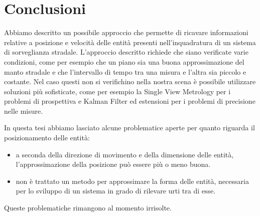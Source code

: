 \chapter{Conclusioni}
\label{sec:conclusioni}

Abbiamo descritto un possibile approccio che permette di ricavare informazioni relative a posizione e velocità delle entità presenti nell'inquadratura di un sistema di sorveglianza stradale.
L'approccio descritto richiede che siano verificate varie condizioni, come per esempio che un piano sia una buona approssimazione del manto stradale e che l'intervallo di tempo tra una misura e l'altra sia piccolo e costante.
Nel caso questi non si verifichino nella nostra scena è possibile utilizzare soluzioni più sofisticate, come per esempio la Single View Metrology \cite{svm} per i problemi di prospettiva e Kalman Filter ed estensioni \cite{kalman} per i problemi di precisione nelle misure.

In questa tesi abbiamo lasciato alcune problematice aperte per quanto riguarda il posizionamento delle entità:
\begin{itemize}
    \item a seconda della direzione di movimento e della dimensione delle entità, l'approssimazione della posizione può essere più o meno buona.
    \item non è trattato un metodo per approssimare la forma delle entità, necessaria per lo sviluppo di un sistema in grado di rilevare urti tra di esse.
\end{itemize}
Queste problematiche rimangono al momento irrisolte.
